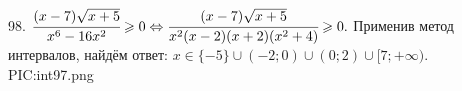 98. $\cfrac{(x-7)\sqrt{x+5}}{x^6-16x^2}\geqslant0\Leftrightarrow
\cfrac{(x-7)\sqrt{x+5}}{x^2(x-2)(x+2)(x^2+4)}\geqslant0.$ Применив метод интервалов, найдём ответ: $x\in\{-5\}\cup(-2;0)\cup(0;2)\cup[7;+\infty).$
{{PIC:int97.png}}\\
